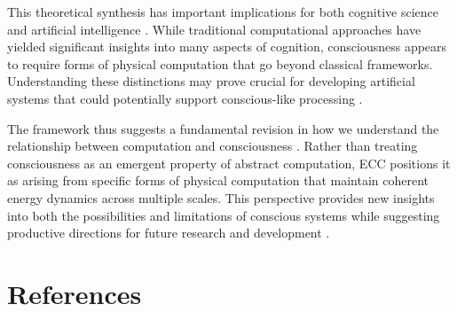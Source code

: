 \begin{refsection}
This theoretical synthesis has important implications for both cognitive science and artificial intelligence \cite{Deutsch2011}. While traditional computational approaches have yielded significant insights into many aspects of cognition, consciousness appears to require forms of physical computation that go beyond classical frameworks. Understanding these distinctions may prove crucial for developing artificial systems that could potentially support conscious-like processing \cite{Aaronson2013}.

The framework thus suggests a fundamental revision in how we understand the relationship between computation and consciousness \cite{Wheeler1990}. Rather than treating consciousness as an emergent property of abstract computation, ECC positions it as arising from specific forms of physical computation that maintain coherent energy dynamics across multiple scales. This perspective provides new insights into both the possibilities and limitations of conscious systems while suggesting productive directions for future research and development \cite{Landauer1996}.

\newpage
\section{References}
\printbibliography[title={},heading=subbibliography]
\end{refsection}